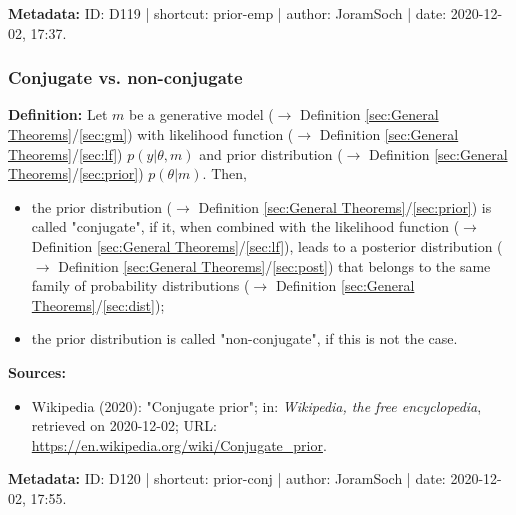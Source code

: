 \documentclass[a4paper,12pt,twoside]{book}
\begin{document}
\vspace{1em}
\textbf{Metadata:} ID: D119 | shortcut: prior-emp | author: JoramSoch | date: 2020-12-02, 17:37.
\vspace{1em}



\subsubsection[\textit{Conjugate vs. non-conjugate}]{Conjugate vs. non-conjugate} \label{sec:prior-conj}
\setcounter{equation}{0}

\textbf{Definition:} Let $m$ be a generative model ($\rightarrow$ Definition \ref{sec:General Theorems}/\ref{sec:gm}) with likelihood function ($\rightarrow$ Definition \ref{sec:General Theorems}/\ref{sec:lf}) $p(y \vert \theta, m)$ and prior distribution ($\rightarrow$ Definition \ref{sec:General Theorems}/\ref{sec:prior}) $p(\theta \vert m)$. Then,

\begin{itemize}

\item the prior distribution ($\rightarrow$ Definition \ref{sec:General Theorems}/\ref{sec:prior}) is called "conjugate", if it, when combined with the likelihood function ($\rightarrow$ Definition \ref{sec:General Theorems}/\ref{sec:lf}), leads to a posterior distribution ($\rightarrow$ Definition \ref{sec:General Theorems}/\ref{sec:post}) that belongs to the same family of probability distributions ($\rightarrow$ Definition \ref{sec:General Theorems}/\ref{sec:dist});

\item the prior distribution is called "non-conjugate", if this is not the case.

\end{itemize}


\vspace{1em}
\textbf{Sources:}
\begin{itemize}
\item Wikipedia (2020): "Conjugate prior"; in: \textit{Wikipedia, the free encyclopedia}, retrieved on 2020-12-02; URL: \url{https://en.wikipedia.org/wiki/Conjugate_prior}.
\end{itemize}


\vspace{1em}
\textbf{Metadata:} ID: D120 | shortcut: prior-conj | author: JoramSoch | date: 2020-12-02, 17:55.
\vspace{1em}
\end{document}
